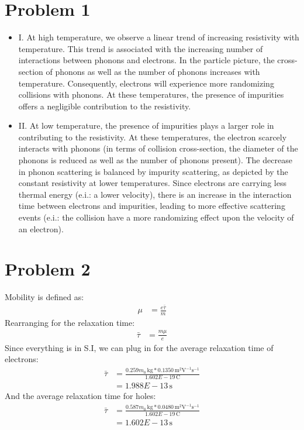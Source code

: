\documentclass{article}
\newcommand{\unit}[1]{\ensuremath{\, \mathrm{#1}}}
\numberwithin{equation}{section}
\begin{document}
\section*{Problem 1}

\begin{itemize}
\item I. At high temperature, we observe a linear trend of increasing resistivity with temperature. This trend is associated with the increasing number of interactions between phonons and electrons. In the particle picture, the cross-section of phonons as well as the number of phonons increases with temperature. Consequently, electrons will experience more randomizing collisions with phonons. At these temperatures, the presence of impurities offers a negligible contribution to the resistivity. 
\item II. At low temperature, the presence of impurities plays a larger role in contributing to the resistivity. At these temperatures, the electron scarcely interacts with phonons (in terms of collision cross-section, the diameter of the phonons is reduced as well as the number of phonons present). The decrease in phonon scattering is balanced by impurity scattering, as depicted by the constant resistivity at lower temperatures. Since electrons are carrying less thermal energy (e.i.: a lower velocity), there is an increase in the interaction time between electrons and impurities, leading to more effective scattering events (e.i.: the collision have a more randomizing effect upon the velocity of an electron). 
\end{itemize}
\section*{Problem 2}
Mobility is defined as:
\begin{align*}
	\mu &= \frac{e\bar{\tau}}{m}
\end{align*}
Rearranging for the relaxation time:
\begin{align*}
	\bar{\tau} &= \frac{m\mu}{e}
\end{align*}
Since everything is in S.I, we can plug in for the average relaxation time of electrons:
\begin{align*}
	\bar{\tau} &= \frac{0.259m_0 \unit{kg}*0.1350 \unit{m^2V^{-1}s^{-1}}}{1.602E-19 \unit{C}}\\
	     &=1.988E-13 \unit{s}	
\end{align*}
And the average relaxation time for holes:
\begin{align*}
	\bar{\tau} &= \frac{0.587m_0 \unit{kg}*0.0480 \unit{m^2V^{-1}s^{-1}}}{1.602E-19 \unit{C}}\\
             &=1.602E-13 \unit{s}
\end{align*}
\end{document}
